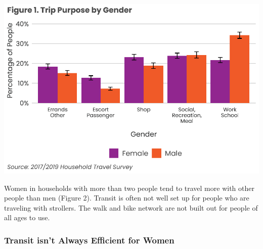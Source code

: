 \documentclass[
  12pt,
]{article}
\begin{document}
\includegraphics{womens_history_story_draft_files/figure-latex/trip by gender-1.pdf}

\begin{flushleft}
Women in households with more than two people tend to travel more with other people than men (Figure 2). Transit is often not well set up for people who are traveling with strollers. The walk and bike network are not built out for people of all ages to use.
\end{flushleft}

\hypertarget{transit-isnt-always-efficient-for-women}{%
\subsubsection{Transit isn't Always Efficient for
Women}\label{transit-isnt-always-efficient-for-women}}
\end{document}
